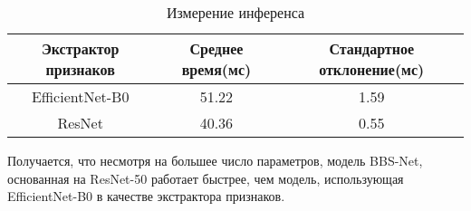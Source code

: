 \begin{center}
    \begin{table}
        \begin{tabular}{ |c|c|c| } 
            \hline
            Экстрактор признаков & Среднее время(мс) & Стандартное отклонение(мс) \\
            \hline
            EfficientNet-B0&51.22&1.59\\
            \hline
            ResNet&40.36&0.55 \\
            \hline
        \end{tabular}
        \caption{Измерение инференса}
        \label{tab:inference}
        \end{table}
    \end{center}

Получается, что несмотря на большее число параметров, модель BBS-Net, основанная на ResNet-50 работает быстрее, чем модель, использующая EfficientNet-B0 в качестве 
экстрактора признаков.  